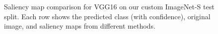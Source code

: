 \begin{figure}[!t]
    \caption{Saliency map comparison for VGG16 on our custom ImageNet-S test split. Each row shows the predicted class (with confidence), original image, and saliency maps from different methods.}
    \label{fig:vgg_saliency_comparison_main}
\end{figure}
